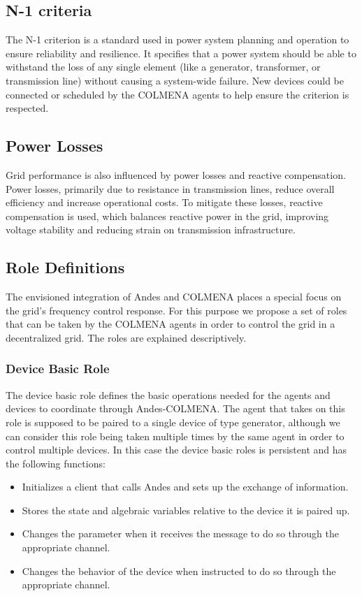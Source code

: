 \documentclass{article}
\begin{document}
\subsection*{N-1 criteria}

The N-1 criterion is a standard used in power system planning and operation to ensure reliability and resilience. It specifies that a power system should be able to withstand the loss of any single element (like a generator, transformer, or transmission line) without causing a system-wide failure. New devices could be connected or scheduled by the COLMENA agents to help ensure the criterion is respected. 

\subsection*{Power Losses}

Grid performance is also influenced by power losses and reactive compensation. Power losses, primarily due to resistance in transmission lines, reduce overall efficiency and increase operational costs. To mitigate these losses, reactive compensation is used, which balances reactive power in the grid, improving voltage stability and reducing strain on transmission infrastructure. 

\subsection{Role Definitions}

The envisioned integration of Andes and COLMENA places a special focus on the grid's frequency control response. For this purpose we propose a set of roles that can be taken by the COLMENA agents in order to control the grid in a decentralized grid. The roles are explained descriptively.  

\subsubsection*{Device Basic Role}

The device basic role defines the basic operations needed for the agents and devices to coordinate through Andes-COLMENA. The agent that takes on this role is supposed to be paired to a single device of type generator, although we can consider this role being taken multiple times by the same agent in order to control multiple devices. In this case the device basic roles is persistent and has the following functions:

 \begin{itemize}
     \item Initializes a client that calls Andes and sets up the exchange of information.
     \item Stores the state and algebraic variables relative to the device it is paired up.
     \item Changes the parameter when it receives the message to do so through the appropriate channel.
     \item Changes the behavior of the device when instructed to do so through the appropriate channel.
 \end{itemize}
\end{document}
